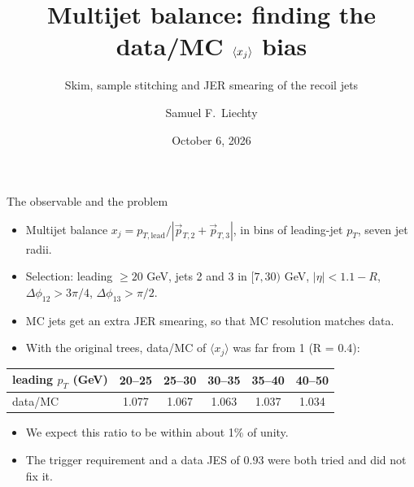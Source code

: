\documentclass[aspectratio=169,10pt]{beamer}
\title{Multijet balance: finding the data/MC $\langle \xj \rangle$ bias}
\subtitle{Skim, sample stitching and JER smearing of the recoil jets}
\author{Samuel F.\ Liechty}
\date{October 6, 2026}
\newcommand{\xj}{x_{j}}
\newcommand{\bad}[1]{\textcolor{bad}{#1}}
\begin{document}
\begin{frame}
  \titlepage
\end{frame}

\begin{frame}{The observable and the problem}
  \begin{itemize}
    \item Multijet balance $\xj = p_{T,\mathrm{lead}} / |\vec p_{T,2} + \vec p_{T,3}|$, in bins of leading-jet $p_T$, seven jet radii.
    \item Selection: leading $\geq 20$ GeV, jets 2 and 3 in $[7, 30)$ GeV, $|\eta| < 1.1 - R$, $\Delta\phi_{12} > 3\pi/4$, $\Delta\phi_{13} > \pi/2$.
    \item MC jets get an extra JER smearing, so that MC resolution matches data.
    \item With the original trees, data/MC of $\langle \xj \rangle$ was far from 1 (R = 0.4):
  \end{itemize}
  \vspace{0.5em}
  \centering
  \begin{tabular}{lccccc}
    \toprule
    leading $p_T$ (GeV) & 20--25 & 25--30 & 30--35 & 35--40 & 40--50 \\
    \midrule
    data/MC & \bad{1.077} & \bad{1.067} & \bad{1.063} & \bad{1.037} & \bad{1.034} \\
    \bottomrule
  \end{tabular}
  \vspace{0.8em}
  \begin{itemize}
    \item We expect this ratio to be within about 1\% of unity.
    \item The trigger requirement and a data JES of 0.93 were both tried and did not fix it.
  \end{itemize}
\end{frame}
\end{document}
